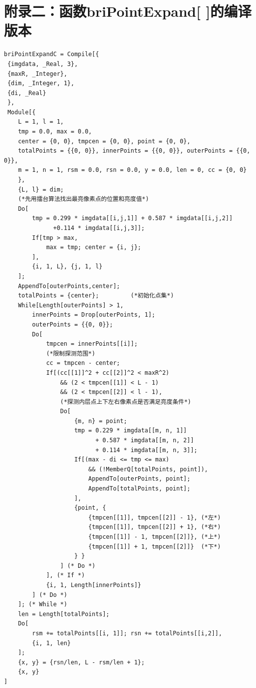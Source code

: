\documentclass[UTF8,a4paper,12pt]{article}
\begin{document}
\section{附录二：函数briPointExpand[ ]的编译版本}
\begin{verbatim}
briPointExpandC = Compile[{
 {imgdata, _Real, 3},
 {maxR, _Integer},
 {dim, _Integer, 1},
 {di, _Real}
 },
 Module[{
    L = 1, l = 1,
    tmp = 0.0, max = 0.0,
    center = {0, 0}, tmpcen = {0, 0}, point = {0, 0},
    totalPoints = {{0, 0}}, innerPoints = {{0, 0}}, outerPoints = {{0, 0}},
    m = 1, n = 1, rsm = 0.0, rsn = 0.0, y = 0.0, len = 0, cc = {0, 0}
    },
    {L, l} = dim;
    (*先用擂台算法找出最亮像素点的位置和亮度值*)
    Do[ 
        tmp = 0.299 * imgdata[[i,j,1]] + 0.587 * imgdata[[i,j,2]]
              +0.114 * imgdata[[i,j,3]];
        If[tmp > max,
            max = tmp; center = {i, j};
        ],
        {i, 1, L}, {j, 1, l}
    ];
    AppendTo[outerPoints,center];
    totalPoints = {center};         (*初始化点集*)
    While[Length[outerPoints] > 1,
        innerPoints = Drop[outerPoints, 1];
        outerPoints = {{0, 0}};
        Do[
            tmpcen = innerPoints[[i]];
            (*限制探测范围*)
            cc = tmpcen - center;
            If[(cc[[1]]^2 + cc[[2]]^2 < maxR^2) 
                && (2 < tmpcen[[1]] < L - 1) 
                && (2 < tmpcen[[2]] < l - 1),
                (*探测内层点上下左右像素点是否满足亮度条件*)
                Do[
                    {m, n} = point;
                    tmp = 0.229 * imgdata[[m, n, 1]] 
                          + 0.587 * imgdata[[m, n, 2]]
                          + 0.114 * imgdata[[m, n, 3]];
                    If[(max - di <= tmp <= max) 
                        && (!MemberQ[totalPoints, point]),
                        AppendTo[outerPoints, point]; 
                        AppendTo[totalPoints, point];
                    ],
                    {point, {
                        {tmpcen[[1]], tmpcen[[2]] - 1}, (*左*)
                        {tmpcen[[1]], tmpcen[[2]] + 1}, (*右*)
                        {tmpcen[[1]] - 1, tmpcen[[2]]}, (*上*)
                        {tmpcen[[1]] + 1, tmpcen[[2]]}  (*下*)
                    } }
                ] (* Do *)
            ], (* If *)
            {i, 1, Length[innerPoints]}
        ] (* Do *)
    ]; (* While *)
    len = Length[totalPoints];
    Do[
        rsm += totalPoints[[i, 1]]; rsn += totalPoints[[i,2]],
        {i, 1, len}
    ];
    {x, y} = {rsn/len, L - rsm/len + 1}; 
    {x, y}
]
\end{verbatim}
\end{document}
